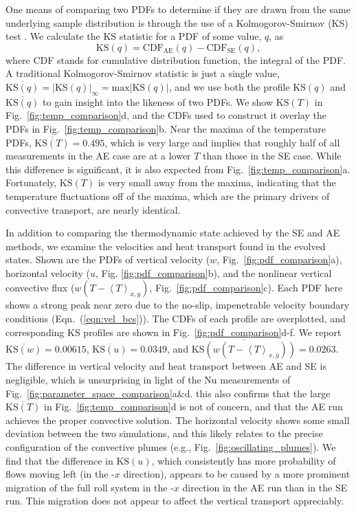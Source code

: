 \documentclass[aps, pre, onecolumn, nofootinbib, notitlepage, groupedaddress, amsfonts, amssymb, amsmath, longbibliography]{revtex4-1}
\newcommand{\angles}[1]{\ensuremath{\left\langle #1 \right\rangle}}
\newcommand{\KS}[1]{\ensuremath{\text{KS}(#1)}}
\newcommand{\KSstat}[1]{\ensuremath{\overline{\text{KS}(#1)}}}
\begin{document}
One means of comparing two
PDFs to determine if they are drawn from the same underlying
sample distribution is through the use of a Kolmogorov-Smirnov (KS) test \cite{wall&jenkins2012}.
We calculate the KS statistic for a PDF of some value, $q$, as
\begin{equation}
\KS{q} = \text{CDF}_{\text{AE}}(q) - \text{CDF}_{\text{SE}}(q),
\label{eqn:ks_profile}
\end{equation}
where CDF stands for cumulative distribution function, the integral of the PDF.
A traditional Kolmogorov-Smirnov statistic is just a single value,
$\KSstat{q} = |\KS{q}|_\infty =
\text{max} |\KS{q}|$, and we use both the profile KS$(q)$ and
$\KSstat{q}$ to gain insight into the likeness of two PDFs. 
We show $\KS{T}$ in Fig.~\ref{fig:temp_comparison}d, and the
CDFs used to construct it overlay the PDFs in Fig.~\ref{fig:temp_comparison}b.
Near the maxima of the temperature PDFs, $\KSstat{T} = 0.495$, 
which is very large and implies that roughly half of all
measurements in the AE case are at a lower $T$ than those in the SE case.
While this difference is significant, it is also expected from Fig.~\ref{fig:temp_comparison}a.
Fortunately, $\KS{T}$ is very small away from the maxima, 
indicating that the temperature fluctuations off of the maxima, which are the primary
drivers of convective transport, are nearly identical.

In addition to comparing the thermodynamic state achieved by the SE and AE methods,
we examine the velocities and heat transport found in the evolved states.
Shown are the PDFs of 
vertical velocity ($w$, Fig.~\ref{fig:pdf_comparison}a), horizontal velocity ($u$, Fig. \ref{fig:pdf_comparison}b),
and the nonlinear vertical convective flux ($w(T - \angles{T}_{x,y})$, Fig.~\ref{fig:pdf_comparison}c). 
Each PDF here shows a strong peak near zero due to the no-slip, impenetrable
velocity boundary conditions (Eqn.~(\ref{eqn:vel_bcs})).
The CDFs of each profile are overplotted, and corresponding KS profiles are
shown in Fig.~\ref{fig:pdf_comparison}d-f.  We report
$\KSstat{w} = 0.00615$, $\KSstat{u} = 0.0349$,
and $\KSstat{w(T - \angles{T}_{x,y})} = 0.0263$.
The difference in vertical velocity
and heat transport between AE and SE is negligible, which is unsurprising in light of
the Nu measurements of Fig.~\ref{fig:parameter_space_comparison}a\&d.
this also confirms that the large $\KSstat{T}$ in Fig.~\ref{fig:temp_comparison}d is
not of concern, and that the AE run achieves the proper convective solution.
The horizontal velocity shows some small deviation between the two simulations, and this
likely relates to the precise configuration of the convective plumes (e.g., Fig.~\ref{fig:oscillating_plumes}).
We find that the difference in $\KS{u}$, which consistently has more probability
of flows moving left (in the -$x$ direction), appears to be caused by a more prominent migration 
of the full roll system in the -$x$ direction in the AE run than in the SE run. 
This migration does not appear to affect the vertical transport appreciably.
\end{document}
